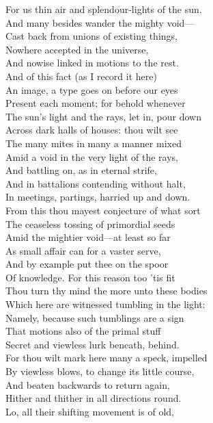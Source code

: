 For us thin air and splendour-lights of the sun.\\
And many besides wander the mighty void—\\
Cast back from unions of existing things,\\
Nowhere accepted in the universe,\\
And nowise linked in motions to the rest.\\
And of this fact (as I record it here)\\
An image, a type goes on before our eyes\\
Present each moment; for behold whenever\\
The sun's light and the rays, let in, pour down\\
Across dark halls of houses: thou wilt see\\
The many mites in many a manner mixed\\
Amid a void in the very light of the rays,\\
And battling on, as in eternal strife,\\
And in battalions contending without halt,\\
In meetings, partings, harried up and down.\\
From this thou mayest conjecture of what sort\\
The ceaseless tossing of primordial seeds\\
Amid the mightier void—at least so far\\
As small affair can for a vaster serve,\\
And by example put thee on the spoor\\
Of knowledge. For this reason too 'tis fit\\
Thou turn thy mind the more unto these bodies\\
Which here are witnessed tumbling in the light:\\
Namely, because such tumblings are a sign\\
That motions also of the primal stuff\\
Secret and viewless lurk beneath, behind.\\
For thou wilt mark here many a speck, impelled\\
By viewless blows, to change its little course,\\
And beaten backwards to return again,\\
Hither and thither in all directions round.\\
Lo, all their shifting movement is of old,\\

